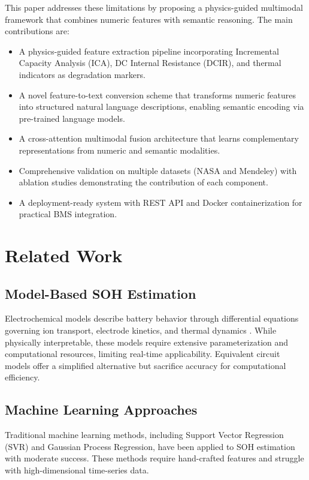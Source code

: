 \documentclass[conference]{IEEEtran}
\begin{document}
This paper addresses these limitations by proposing a physics-guided multimodal framework that combines numeric features with semantic reasoning. The main contributions are:

\begin{itemize}
    \item A physics-guided feature extraction pipeline incorporating Incremental Capacity Analysis (ICA), DC Internal Resistance (DCIR), and thermal indicators as degradation markers.
    \item A novel feature-to-text conversion scheme that transforms numeric features into structured natural language descriptions, enabling semantic encoding via pre-trained language models.
    \item A cross-attention multimodal fusion architecture that learns complementary representations from numeric and semantic modalities.
    \item Comprehensive validation on multiple datasets (NASA and Mendeley) with ablation studies demonstrating the contribution of each component.
    \item A deployment-ready system with REST API and Docker containerization for practical BMS integration.
\end{itemize}

\section{Related Work}

\subsection{Model-Based SOH Estimation}

Electrochemical models describe battery behavior through differential equations governing ion transport, electrode kinetics, and thermal dynamics \cite{han2014}. While physically interpretable, these models require extensive parameterization and computational resources, limiting real-time applicability. Equivalent circuit models offer a simplified alternative but sacrifice accuracy for computational efficiency.

\subsection{Machine Learning Approaches}

Traditional machine learning methods, including Support Vector Regression (SVR) \cite{widodo2011} and Gaussian Process Regression, have been applied to SOH estimation with moderate success. These methods require hand-crafted features and struggle with high-dimensional time-series data.
\end{document}
